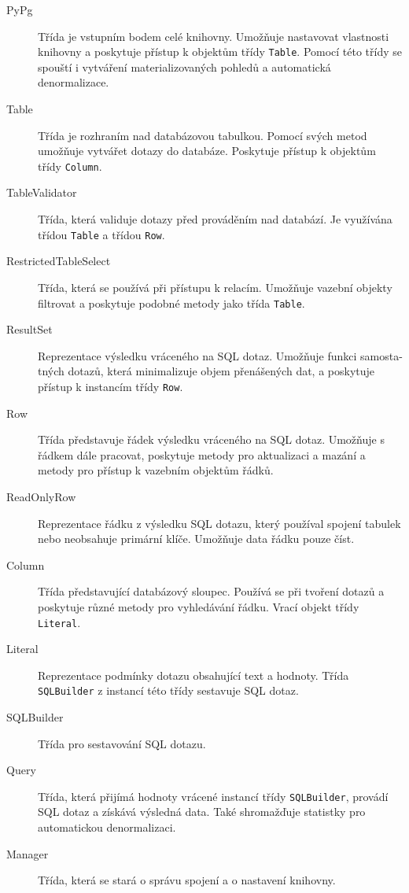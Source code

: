 \documentclass[ing,male,java,dept456]{diploma}						%
\begin{document}
\begin{description}
\item[PyPg] Třída je vstupním bodem celé knihovny. Umožňuje nastavovat vlastnosti knihovny a poskytuje přístup k objektům třídy \lstinline[style=inlinepython]|Table|. Pomocí této třídy se spouští i vytváření materializovaných pohledů a automatická denormalizace.
\item[Table] Třída je rozhraním nad databázovou tabulkou. Pomocí svých metod umožňuje vytvářet dotazy do databáze. Poskytuje přístup k objektům třídy \lstinline[style=inlinepython]|Column|.
\item[TableValidator] Třída, která validuje dotazy před prováděním nad databází. Je využívána třídou \lstinline[style=inlinepython]|Table| a třídou \lstinline[style=inlinepython]|Row|.
\item[RestrictedTableSelect] Třída, která se používá při přístupu k relacím. Umožňuje vazební objekty filtrovat a poskytuje podobné metody jako třída \lstinline[style=inlinepython]|Table|. 
\item[ResultSet] Reprezentace výsledku vráceného na SQL dotaz. Umožňuje funkci samosta- tných dotazů, která minimalizuje objem přenášených dat, a poskytuje přístup k instancím třídy \lstinline[style=inlinepython]|Row|.
\item[Row] Třída představuje řádek výsledku vráceného na SQL dotaz. Umožňuje s řádkem dále pracovat, poskytuje metody pro aktualizaci a mazání a metody pro přístup k vazebním objektům řádků.
\item[ReadOnlyRow] Reprezentace řádku z výsledku SQL dotazu, který používal spojení tabulek nebo neobsahuje primární klíče. Umožňuje data řádku pouze číst.
\item[Column] Třída představující databázový sloupec. Používá se při tvoření dotazů a poskytuje různé metody pro vyhledávání řádku. Vrací objekt třídy \lstinline[style=inlinepython]|Literal|.
\item[Literal] Reprezentace podmínky dotazu obsahující text a hodnoty. Třída \lstinline[style=inlinepython]|SQLBuilder| z instancí této třídy sestavuje SQL dotaz.
\item[SQLBuilder] Třída pro sestavování SQL dotazu.
\item[Query] Třída, která přijímá hodnoty vrácené instancí třídy \lstinline[style=inlinepython]|SQLBuilder|, provádí SQL dotaz a získává výsledná data. Také shromažďuje statistky pro automatickou denormalizaci.
\item[Manager] Třída, která se stará o správu spojení a o nastavení knihovny.

\end{description}
\end{document}
